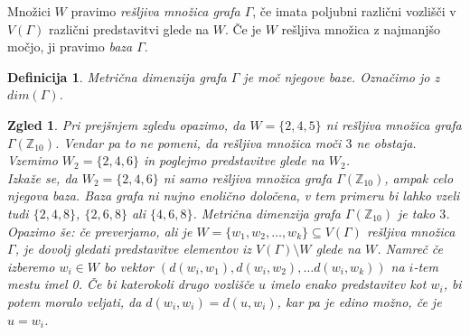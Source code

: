 \documentclass[a4paper,12pt]{article}
\def\Z{\mathbb{Z}} %
\newtheorem{definicija}{Definicija}
\newtheorem{zgled}{Zgled}
\begin{document}
%
  Množici $W$ pravimo \emph{rešljiva množica grafa $\Gamma$}, če imata poljubni različni 
  vozlišči v $V(\Gamma)$ različni predstavitvi glede na $W$. Če je $W$ rešljiva množica 
  z najmanjšo močjo, ji pravimo \emph{baza $\Gamma$}.
%
\begin{definicija}
    \emph{Metrična dimenzija grafa $\Gamma$} je moč njegove baze. Označimo jo z $dim(\Gamma)$.
\end{definicija}
%
\begin{zgled}
    Pri prejšnjem zgledu opazimo, da $W = \{2,4,5\}$ ni rešljiva množica grafa $\Gamma(\Z_{10})$. 
    Vendar pa to ne pomeni, da rešljiva množica moči $3$ ne obstaja. Vzemimo $W_2 = \{2,4,6\}$ in 
    poglejmo predstavitve glede na $W_2$.\\
    Izkaže se, da $W_2 = \{2,4,6\}$ ni samo rešljiva množica grafa $\Gamma(\Z_{10})$, ampak 
    celo njegova baza. Baza grafa ni nujno enolično določena, v tem primeru bi lahko vzeli 
    tudi $\{2,4,8\}$, $\{2,6,8\}$ ali $\{4,6,8\}$. Metrična dimenzija grafa $\Gamma(\Z_{10})$ je 
    tako $3$.\\
    Opazimo še: če preverjamo, ali je $W= \{w_1,w_2, \ldots, w_k\} \subseteq V(\Gamma)$ 
    rešljiva množica $\Gamma$, je dovolj gledati predstavitve elementov iz 
    $V(\Gamma) \setminus W$ glede na $W$. Namreč če izberemo $w_i \in W$ bo vektor 
    $(d(w_i,w_1),d(w_i,w_2), \ldots d(w_i,w_k))$ na $i$-tem mestu imel 0. 
    Če bi katerokoli drugo vozlišče $u$ imelo enako predstavitev kot $w_i$, bi 
    potem moralo veljati, da $d(w_i,w_i) = d(u,w_i)$, kar pa je edino možno, 
    če je $u = w_i$.
\end{zgled}
%


%
%
\end{document}
